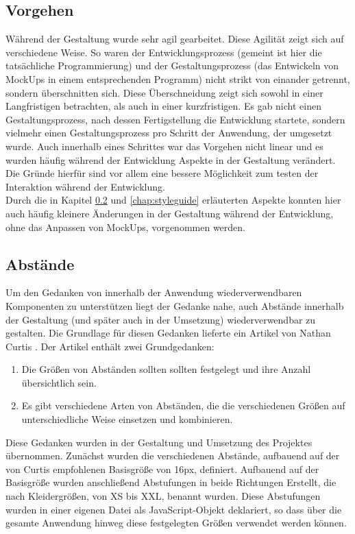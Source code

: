 \subsection{Vorgehen}
Während der Gestaltung wurde sehr agil gearbeitet. Diese Agilität zeigt sich auf verschiedene Weise.
So waren der Entwicklungsprozess (gemeint ist hier die tatsächliche Programmierung) und der Gestaltungsprozess (das Entwickeln von MockUps in einem entsprechenden Programm) nicht strikt von einander getrennt, sondern überschnitten sich. Diese Überschneidung zeigt sich sowohl in einer Langfristigen betrachten, als auch in einer kurzfristigen. Es gab nicht einen Gestaltungsprozess, nach dessen Fertigstellung die Entwicklung startete, sondern vielmehr einen Gestaltungsprozess pro Schritt der Anwendung, der umgesetzt wurde. Auch innerhalb eines Schrittes war das Vorgehen nicht linear und es wurden häufig während der Entwicklung Aspekte in der Gestaltung verändert. Die Gründe hierfür sind vor allem eine bessere Möglichkeit zum testen der Interaktion während der Entwicklung.\\
Durch die in Kapitel \ref{chap:spacing} und \ref{chap:styleguide} erläuterten Aspekte konnten hier auch häufig kleinere Änderungen in der Gestaltung während der Entwicklung, ohne das Anpassen von MockUps, vorgenommen werden.

\subsection{Abstände}
\label{chap:spacing}
Um den Gedanken von innerhalb der Anwendung wiederverwendbaren Komponenten zu unterstützen liegt der Gedanke nahe, auch Abstände innerhalb der Gestaltung (und später auch in der Umsetzung) wiederverwendbar zu gestalten. Die Grundlage für diesen Gedanken lieferte ein Artikel von Nathan Curtis \cite{CurtisSpace16}. Der Artikel enthält zwei Grundgedanken:

\begin{enumerate}
  \item Die Größen von Abständen sollten sollten festgelegt und ihre Anzahl übersichtlich sein.
  \item Es gibt verschiedene Arten von Abständen, die die verschiedenen Größen auf unterschiedliche Weise einsetzen und kombinieren.
\end{enumerate}

Diese Gedanken wurden in der Gestaltung und Umsetzung des Projektes übernommen. Zunächst wurden die verschiedenen Abstände, aufbauend auf der von Curtis empfohlenen Basisgröße von 16px, definiert. Aufbauend auf der Basisgröße wurden anschließend Abstufungen in beide Richtungen
Erstellt, die nach Kleidergrößen, von XS bis XXL, benannt wurden.
Diese Abstufungen wurden in einer eigenen Datei als JavaScript-Objekt deklariert, so dass über die gesamte Anwendung hinweg diese festgelegten Größen verwendet werden können.

